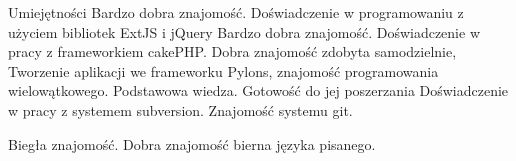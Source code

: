\begin{rubric}{Umiejętności}
\entry*[JavaScript]
	Bardzo dobra znajomość. Doświadczenie w programowaniu z użyciem
	bibliotek ExtJS i jQuery
\entry*[PHP]
	Bardzo dobra znajomość. Doświadczenie w pracy z frameworkiem cakePHP.
\entry*[Python]
	Dobra znajomość zdobyta samodzielnie, Tworzenie aplikacji we frameworku Pylons, 
	znajomość programowania wielowątkowego.
\entry*[Java, C, C++]
	Podstawowa wiedza. Gotowość do jej poszerzania
	Doświadczenie w pracy z systemem subversion. Znajomość systemu git.

\entry*[Angielski]
	Biegła znajomość.
\entry*[Rosyjski]
	Dobra znajomość bierna języka pisanego.
\end{rubric}
